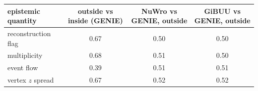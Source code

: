 \begin{tabular}{lccc}
\toprule
epistemic quantity & outside vs inside (GENIE) & NuWro vs GENIE, outside & GiBUU vs GENIE, outside \\
\midrule
reconstruction flag & 0.67 & 0.50 & 0.50 \\
multiplicity & 0.68 & 0.51 & 0.50 \\
event flow & 0.39 & 0.51 & 0.51 \\
vertex $z$ spread & 0.67 & 0.52 & 0.52 \\
\bottomrule
\end{tabular}
